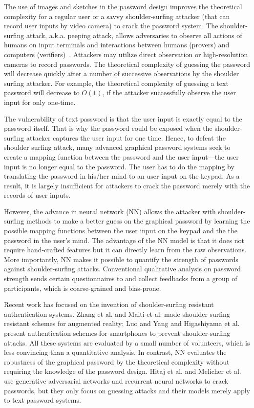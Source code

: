 \documentclass{article}
\begin{document}
The use of images and sketches in the password design improves the theoretical complexity for a regular user or a savvy shoulder-surfing attacker (that can record user inputs by video camera) to crack the password system. The shoulder-surfing attack, a.k.a. peeping attack, allows adversaries to observe all actions of humans on input terminals and interactions between humans (provers) and computers (verifiers)~\cite{DBLP:journals/iacr/LiS05,DBLP:journals/cacm/Anderson94a}. Attackers may utilize direct observation or high-resolution cameras to record passwords. The theoretical complexity of guessing the password will decrease quickly after a number of successive observations by the shoulder surfing attacker. For example, the theoretical complexity of guessing a text password will decrease to $O(1)$, if the attacker successfully observe the user input for only one-time.

The vulnerability of text password is that the user input is exactly equal to the password itself. That is why the password could be exposed when the shoulder-surfing attacker captures the user input for one time.
Hence, to defeat the shoulder surfing attack, many advanced graphical password systems seek to create a mapping function between the password and the user input---the user input is no longer equal to the password. The user has to do the mapping by translating the password in his/her mind to an user input on the keypad. As a result, it is largely insufficient for attackers to crack the password merely with the records of user inputs.


However, the advance in neural network (NN) allows the attacker with shoulder-surfing methods to make a better guess on the graphical password by learning the possible mapping functions between the user input on the keypad and the the password in the user's mind. The advantage of the NN model is that it does not require hand-crafted features but it can directly learn from the raw observations. More importantly, NN makes it possible to quantify the strength of passwords against shoulder-surfing attacks. Conventional qualitative analysis on password strength sends certain questionnaires to and collect feedbacks from a group of participants, which is coarse-grained and bias-prone. 

Recent work has focused on the invention of shoulder-surfing resistant authentication systems. Zhang et al. \cite{DBLPHK17} and Maiti et al. \cite{DBLPJW17} made shoulder-surfing resistant schemes for augmented reality; Luo and Yang \cite{DBLP:journals/mta/LuoY16} and Higashiyama et al. \cite{DBLPOF15} present authentication schemes for smartphones to prevent shoulder-surfing attacks. All these systems are evaluated by a small number of volunteers, which is less convincing than a quantitative analysis. In contrast, NN evaluates the robustness of the graphical password by the theoretical complexity without requiring the knowledge of the password design. Hitaj et al. \cite{DBLP:journals/corr/abs-1709-00440} and Melicher et al. \cite{DBLP:conf/uss/MelicherUSKBCC16} use generative adversarial networks \cite{DBLP:journals/corr/GoodfellowPMXWOCB14} and recurrent neural networks to crack passwords, but they only focus on guessing attacks and their models merely apply to text password systems.
\end{document}
